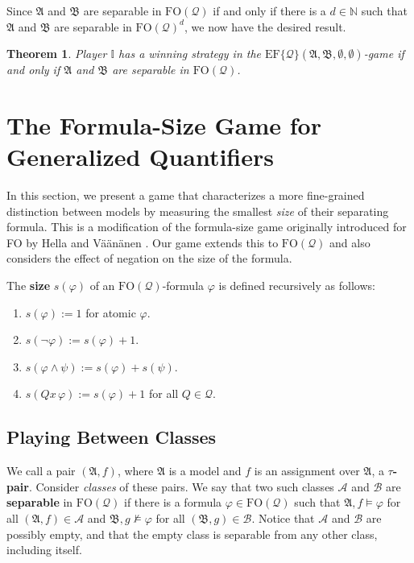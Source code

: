 \documentclass{article}
\newtheorem{theorem}{Theorem}[section]
\theoremstyle{definition}
\begin{document}
Since $\mathfrak{A}$ and $\mathfrak{B}$ are separable in $\mathrm{FO}(\mathcal{Q})$ if and only if there is a $d\in\mathbb{N}$ such that $\mathfrak{A}$ and $\mathfrak{B}$ are separable in $\mathrm{FO}(\mathcal{Q})^{d}$, we now have the desired result.
\begin{theorem}\label{thm:ef-game-characterizes-equivalence}
    Player $\mathbb{I}$ has a winning strategy in the $\mathrm{EF}\{\mathcal{Q}\}(\mathfrak{A},\mathfrak{B},\emptyset,\emptyset)$-game if and only if $\mathfrak{A}$ and $\mathfrak{B}$ are separable in $\mathrm{FO}(\mathcal{Q})$.
\end{theorem}

\section{The Formula-Size Game for Generalized Quantifiers}

In this section, we present a game that characterizes a more fine-grained distinction between models by measuring the smallest \textit{size} of their separating formula. This is a modification of the formula-size game originally introduced for FO by Hella and Väänänen \cite{hellavaananen}. Our game extends this to $\mathrm{FO}(\mathcal{Q})$ and also considers the effect of negation on the size of the formula.

The \textbf{size} $s(\varphi)$ of an $\mathrm{FO}(\mathcal{Q})$-formula $\varphi$ is defined recursively as follows:
\begin{enumerate}
    \item $s(\varphi):=1$ for atomic $\varphi$.
    \item $s(\neg\varphi):=s(\varphi)+1$.
    \item $s(\varphi\land\psi):=s(\varphi)+s(\psi)$.
    \item $s(Qx\, \varphi):=s(\varphi)+1$ for all $Q \in \mathcal{Q}$.
\end{enumerate}

\subsection{Playing Between Classes}

We call a pair $(\mathfrak{A},f)$, where $\mathfrak{A}$ is a model and $f$ is an assignment over $\mathfrak{A}$, a $\tau$\textbf{-pair}. Consider \textit{classes} of these pairs. We say that two such classes $\mathcal{A}$ and $\mathcal{B}$ are \textbf{separable} in $\mathrm{FO}(\mathcal{Q})$ if there is a formula $\varphi\in\mathrm{FO}(\mathcal{Q})$ such that $\mathfrak{A},f\models \varphi$ for all $(\mathfrak{A},f)\in \mathcal{A}$ and $\mathfrak{B},g\not\models\varphi$ for all $(\mathfrak{B},g)\in \mathcal{B}$. Notice that $\mathcal{A}$ and $\mathcal{B}$ are possibly empty, and that the empty class is separable from any other class, including itself.
\end{document}

